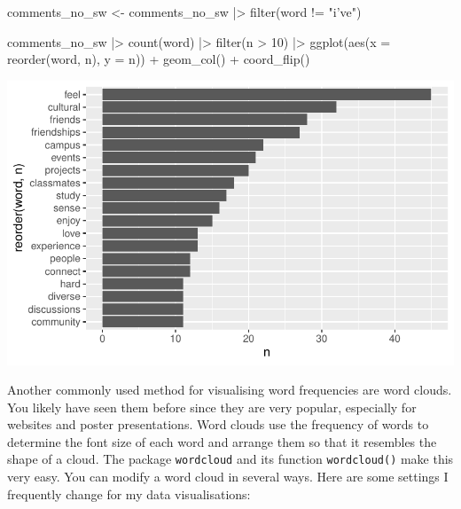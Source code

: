 \documentclass[
  letterpaper,
]{krantz}
\makeatletter
\newenvironment{Shaded}{\begin{snugshade}}{\end{snugshade}}
\newcommand{\AttributeTok}[1]{\textcolor[rgb]{0.40,0.45,0.13}{#1}}
\newcommand{\DecValTok}[1]{\textcolor[rgb]{0.68,0.00,0.00}{#1}}
\newcommand{\FunctionTok}[1]{\textcolor[rgb]{0.28,0.35,0.67}{#1}}
\newcommand{\NormalTok}[1]{\textcolor[rgb]{0.00,0.23,0.31}{#1}}
\newcommand{\OtherTok}[1]{\textcolor[rgb]{0.00,0.23,0.31}{#1}}
\newcommand{\SpecialCharTok}[1]{\textcolor[rgb]{0.37,0.37,0.37}{#1}}
\newcommand{\StringTok}[1]{\textcolor[rgb]{0.13,0.47,0.30}{#1}}
\newenvironment{kframe}{%
\medskip{}
\setlength{\fboxsep}{.8em}
 \def\at@end@of@kframe{}%
 \ifinner\ifhmode%
  \def\at@end@of@kframe{\end{minipage}}%
  \begin{minipage}{\columnwidth}%
 \fi\fi%
 \def\FrameCommand##1{\hskip\@totalleftmargin \hskip-\fboxsep
 \colorbox{shadecolor}{##1}\hskip-\fboxsep
     \hskip-\linewidth \hskip-\@totalleftmargin \hskip\columnwidth}%
 \MakeFramed {\advance\hsize-\width
   \@totalleftmargin\z@ \linewidth\hsize
   \@setminipage}}%
 {\par\unskip\endMakeFramed%
 \at@end@of@kframe}
\renewenvironment{Shaded}{\begin{kframe}}{\end{kframe}}
\makeatother
\begin{document}
\begin{Shaded}
\begin{Highlighting}[]
\NormalTok{comments\_no\_sw }\OtherTok{\textless{}{-}} 
\NormalTok{  comments\_no\_sw }\SpecialCharTok{|\textgreater{}}
  \FunctionTok{filter}\NormalTok{(word }\SpecialCharTok{!=} \StringTok{"i’ve"}\NormalTok{)}
  
\NormalTok{comments\_no\_sw }\SpecialCharTok{|\textgreater{}}
  \FunctionTok{count}\NormalTok{(word) }\SpecialCharTok{|\textgreater{}}
  \FunctionTok{filter}\NormalTok{(n }\SpecialCharTok{\textgreater{}} \DecValTok{10}\NormalTok{) }\SpecialCharTok{|\textgreater{}}
  \FunctionTok{ggplot}\NormalTok{(}\FunctionTok{aes}\NormalTok{(}\AttributeTok{x =} \FunctionTok{reorder}\NormalTok{(word, n),}
             \AttributeTok{y =}\NormalTok{ n)) }\SpecialCharTok{+}
  \FunctionTok{geom\_col}\NormalTok{() }\SpecialCharTok{+}
  \FunctionTok{coord\_flip}\NormalTok{()}
\end{Highlighting}
\end{Shaded}

\includegraphics{14_mixed_methods_files/figure-pdf/manually-remove-stopwords-1.pdf}

Another commonly used method for visualising word frequencies are word
clouds. You likely have seen them before since they are very popular,
especially for websites and poster presentations. Word clouds use the
frequency of words to determine the font size of each word and arrange
them so that it resembles the shape of a cloud. The package
\texttt{wordcloud} and its function \texttt{wordcloud()} make this very
easy. You can modify a word cloud in several ways. Here are some
settings I frequently change for my data visualisations:
\end{document}
